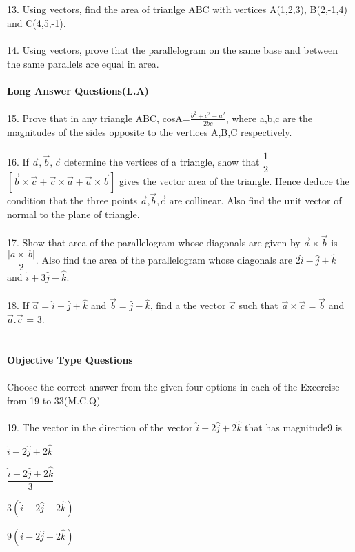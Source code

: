 \documentclass{article}
\newcommand{\choice}{\item}
\begin{document}
\\
\\
13. Using vectors, find the area of trianlge ABC with vertices A(1,2,3), B(2,-1,4) and C(4,5,-1).
\\
\\
14. Using vectors, prove that the parallelogram on the same base and between the same parallels are equal in area.
\\
\\
\textbf{Long Answer Questions(L.A)}
\\
\\
15. Prove that in any triangle ABC, cosA=$\frac{b^2+c^2-a^2}{2bc}$, where a,b,c are the magnitudes of the sides opposite to the vertices A,B,C respectively.
\\
\\
16. If $\overrightarrow{a},\overrightarrow{b},\overrightarrow{c}$ determine the vertices of a triangle, show that $\dfrac{1}{2}$ $\left[ \overrightarrow{b}\times\overrightarrow{c}+ \overrightarrow{c} \times\overrightarrow{a}+ \overrightarrow{a} \times\overrightarrow{b} \right]$ gives the vector area of the triangle. Hence deduce the condition that the three points $\overrightarrow{a}$,$\overrightarrow{b}$,$ \overrightarrow{c}$ are collinear. Also find the unit vector of normal to the plane of triangle.
\\
\\
17. Show that area of the parallelogram whose diagonals are given by $\overrightarrow{a}\times\overrightarrow{b}$ is $\dfrac{|a \times\ b|}{2}$. Also find the area of the parallelogram whose diagonals are $2\hat{i}-\hat{j}+\hat{k}$ and $\hat{i}+3\hat{j}-\hat{k}$.
\\
\\
18. If $\overrightarrow{a}=\hat{i}+\hat{j}+\hat{k}$ and $\overrightarrow{b}=\hat{j}-\hat{k}$, find a the vector $\overrightarrow{c}$ such that $\overrightarrow{a}\times\overrightarrow{c}=\overrightarrow{b}$ and $\overrightarrow{a}.\overrightarrow{c}$ = 3.
\\
\\
\\
\textbf{Objective Type Questions}
\\
\\
Choose the correct answer from the given four options in each of the Excercise from 19 to 33(M.C.Q)
\\
\\
19. The vector in the direction of the vector $\hat{i}-2\hat{j}+2\hat{k}$ that has magnitude9 is
\begin {choices}[twocol]
\choice $\hat{i}-2\hat{j}+2\hat{k}$ 		
\choice $\dfrac{\hat{i}-2 \hat{j}+2\hat{k}}{3}$ 
\choice 3$(\hat{i}-2\hat{j}+2\hat{k})$
\choice 9$(\hat{i}-2\hat{j}+2\hat{k})$
\end{choices}
\end{document}
